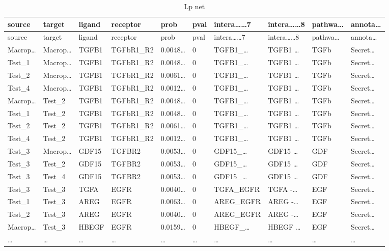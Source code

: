 \documentclass[
]{article}
\begin{document}
\begin{longtable}[]{@{}llllllllll@{}}
\caption{\label{tab:lp-net}Lp net}\tabularnewline
\toprule
source & target & ligand & receptor & prob & pval & intera\ldots\ldots7 & intera\ldots\ldots8 & pathwa\ldots{} & annota\ldots{}\tabularnewline
\midrule
\endfirsthead
\toprule
source & target & ligand & receptor & prob & pval & intera\ldots\ldots7 & intera\ldots\ldots8 & pathwa\ldots{} & annota\ldots{}\tabularnewline
\midrule
\endhead
Macrop\ldots{} & Macrop\ldots{} & TGFB1 & TGFbR1\_R2 & 0.0048\ldots{} & 0 & TGFB1\_\ldots{} & TGFB1 \ldots{} & TGFb & Secret\ldots{}\tabularnewline
Test\_1 & Macrop\ldots{} & TGFB1 & TGFbR1\_R2 & 0.0048\ldots{} & 0 & TGFB1\_\ldots{} & TGFB1 \ldots{} & TGFb & Secret\ldots{}\tabularnewline
Test\_2 & Macrop\ldots{} & TGFB1 & TGFbR1\_R2 & 0.0061\ldots{} & 0 & TGFB1\_\ldots{} & TGFB1 \ldots{} & TGFb & Secret\ldots{}\tabularnewline
Test\_4 & Macrop\ldots{} & TGFB1 & TGFbR1\_R2 & 0.0012\ldots{} & 0 & TGFB1\_\ldots{} & TGFB1 \ldots{} & TGFb & Secret\ldots{}\tabularnewline
Macrop\ldots{} & Test\_2 & TGFB1 & TGFbR1\_R2 & 0.0048\ldots{} & 0 & TGFB1\_\ldots{} & TGFB1 \ldots{} & TGFb & Secret\ldots{}\tabularnewline
Test\_1 & Test\_2 & TGFB1 & TGFbR1\_R2 & 0.0048\ldots{} & 0 & TGFB1\_\ldots{} & TGFB1 \ldots{} & TGFb & Secret\ldots{}\tabularnewline
Test\_2 & Test\_2 & TGFB1 & TGFbR1\_R2 & 0.0061\ldots{} & 0 & TGFB1\_\ldots{} & TGFB1 \ldots{} & TGFb & Secret\ldots{}\tabularnewline
Test\_4 & Test\_2 & TGFB1 & TGFbR1\_R2 & 0.0012\ldots{} & 0 & TGFB1\_\ldots{} & TGFB1 \ldots{} & TGFb & Secret\ldots{}\tabularnewline
Test\_3 & Macrop\ldots{} & GDF15 & TGFBR2 & 0.0053\ldots{} & 0 & GDF15\_\ldots{} & GDF15 \ldots{} & GDF & Secret\ldots{}\tabularnewline
Test\_3 & Test\_2 & GDF15 & TGFBR2 & 0.0053\ldots{} & 0 & GDF15\_\ldots{} & GDF15 \ldots{} & GDF & Secret\ldots{}\tabularnewline
Test\_3 & Test\_4 & GDF15 & TGFBR2 & 0.0053\ldots{} & 0 & GDF15\_\ldots{} & GDF15 \ldots{} & GDF & Secret\ldots{}\tabularnewline
Test\_3 & Test\_3 & TGFA & EGFR & 0.0040\ldots{} & 0 & TGFA\_EGFR & TGFA -\ldots{} & EGF & Secret\ldots{}\tabularnewline
Test\_1 & Test\_3 & AREG & EGFR & 0.0063\ldots{} & 0 & AREG\_EGFR & AREG -\ldots{} & EGF & Secret\ldots{}\tabularnewline
Test\_2 & Test\_3 & AREG & EGFR & 0.0040\ldots{} & 0 & AREG\_EGFR & AREG -\ldots{} & EGF & Secret\ldots{}\tabularnewline
Macrop\ldots{} & Test\_3 & HBEGF & EGFR & 0.0159\ldots{} & 0 & HBEGF\_\ldots{} & HBEGF \ldots{} & EGF & Secret\ldots{}\tabularnewline
\ldots{} & \ldots{} & \ldots{} & \ldots{} & \ldots{} & \ldots{} & \ldots{} & \ldots{} & \ldots{} & \ldots{}\tabularnewline
\bottomrule
\end{longtable}
\end{document}
